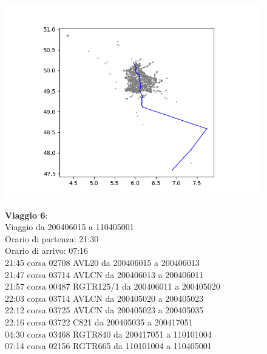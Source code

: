 \documentclass{article}
\begin{document}
\begin{figure}[H]
	\begin{minipage}{0.55\linewidth}
		\centering
		\hspace*{-6cm}\includegraphics[width=1.0\linewidth, valign=t]{figures/Figure_1}
	\end{minipage}
	\hspace*{-4cm}\begin{minipage}{0.7\linewidth}
		\textbf{Viaggio 6}:\\
		Viaggio da 200406015 a 110405001\\
		Orario di partenza: 21:30\\
		Orario di arrivo: 07:16\\
		21:45 corsa 02708 AVL20 da 200406015 a 200406013\\
		21:47 corsa 03714 AVLCN da 200406013 a 200406011\\
		21:57 corsa 00487 RGTR125/1 da 200406011 a 200405020\\
		22:03 corsa 03714 AVLCN da 200405020 a 200405023\\
		22:12 corsa 03725 AVLCN da 200405023 a 200405035\\
		22:16 corsa 03722 C821 da 200405035 a 200417051\\
		04:30 corsa 03468 RGTR840 da 200417051 a 110101004\\
		07:14 corsa 02156 RGTR665 da 110101004 a 110405001
		
			\end{minipage}
\end{figure}
\end{document}
